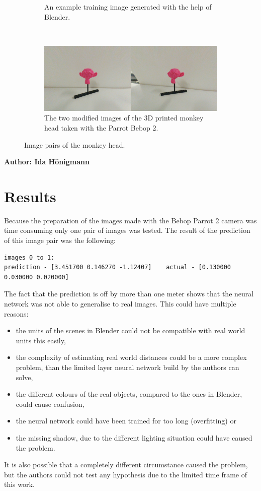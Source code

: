 \begin{figure}[h!]
\begin{subfigure}[t]{\textwidth}
		\caption{An example training image generated with the help of Blender.}
	\end{subfigure}
	~ 
	\begin{subfigure}[t]{\textwidth}
		\centering
		\includegraphics[width=\textwidth]{img/experiment2_environment_comparison_1.jpg}
		\caption{The two modified images of the 3D printed monkey head taken with the Parrot Bebop 2.}
	\end{subfigure}
	\caption{Image pairs of the monkey head.}
	\label{pic:experiment2_environment_comparison}
\end{figure}

\vspace{5mm}
\noindent
\textbf{Author: Ida Hönigmann}

\section{Results}
Because the preparation of the images made with the Bebop Parrot 2 camera was time consuming only one pair of images was tested. The result of the prediction of this image pair was the following:

\begin{lstlisting}[]
images 0 to 1:
prediction - [3.451700 0.146270 -1.12407]    actual - [0.130000 0.030000 0.020000]
\end{lstlisting}

The fact that the prediction is off by more than one meter shows that the neural network was not able to generalise to real images. This could have multiple reasons:

\begin{itemize}
	\item the units of the scenes in Blender could not be compatible with real world units this easily,
	\item the complexity of estimating real world distances could be a more complex problem, than the limited layer neural network build by the authors can solve,
	\item the different colours of the real objects, compared to the ones in Blender, could cause confusion,
	\item the neural network could have been trained for too long (overfitting) or
	\item the missing shadow, due to the different lighting situation could have caused the problem.
\end{itemize}

It is also possible that a completely different circumstance caused the problem, but the authors could not test any hypothesis due to the limited time frame of this work.

\filbreak